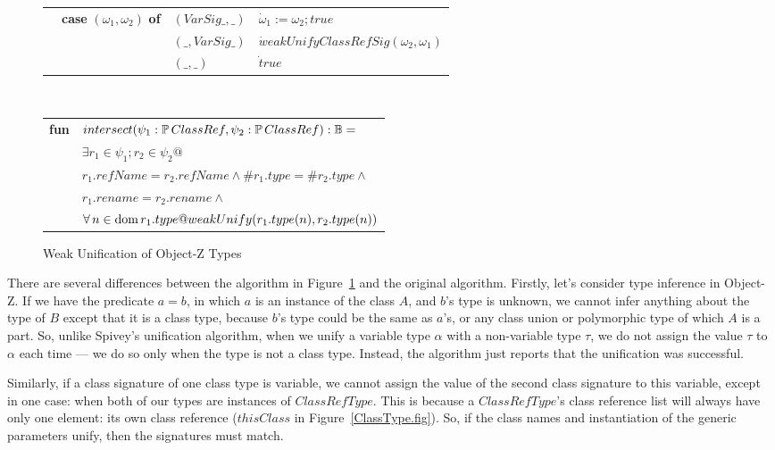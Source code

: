 \begin{figure}[!t]
\begin{tabular}{llll}
  & {\bf case} $(\omega_1,\omega_2)$ {\bf of} & $(VarSig \_, \_ )$
  & $\dot \omega_1 := \omega_2; true$\\
      & & $(\_, VarSig \_)$ & $\dot weakUnifyClassRefSig(\omega_2,\omega_1)$\\
      & & $(\_, \_)$ & $\dot true$\\
\end{tabular}
\vspace{2mm}\\
\begin{tabular}{ll}
  {\bf fun} & $intersect(\psi_1:\power ClassRef, \psi_2:\power ClassRef) : \bool =$\\
   & \quad\quad$\exists r_1 \in \psi_1; r_2 \in \psi_2 @$\\
   & \quad\quad\quad\quad $r_1.refName = r_2.refName \land \#r_1.type = \#r_2.type \land$\\
   & \quad\quad\quad\quad $r_1.rename = r_2.rename \land$\\
   & \quad\quad\quad\quad $\forall n \in \dom r_1.type @
       weakUnify(r_1.type(n), r_2.type(n))$
\end{tabular}
\caption{Weak Unification of Object-Z Types}
\label{weakUnify}
\end{figure}

There are several differences between the algorithm in
Figure~\ref{weakUnify} and the original algorithm. Firstly, let's
consider type inference in Object-Z. If we have the predicate $a = b$,
in which $a$ is an instance of the class $A$, and $b$'s type is
unknown, we cannot infer anything about the type of $B$ except that it
is a class type, because $b$'s type could be the same as $a$'s, or any
class union or polymorphic type of which $A$ is a part. So, unlike
Spivey's unification algorithm, when we unify a variable type $\alpha$
with a non-variable type $\tau$, we do not assign the value $\tau$ to
$\alpha$ each time --- we do so only when the type is not a class
type. Instead, the algorithm just reports that the unification was
successful.
  
Similarly, if a class signature of one class type is variable, we
cannot assign the value of the second class signature to this
variable, except in one case: when both of our types are instances of
$ClassRefType$. This is because a $ClassRefType$'s class reference
list will always have only one element: its own class reference
($thisClass$ in Figure~\ref{ClassType.fig}). So, if the class names
and instantiation of the generic parameters unify, then the signatures
must match.

